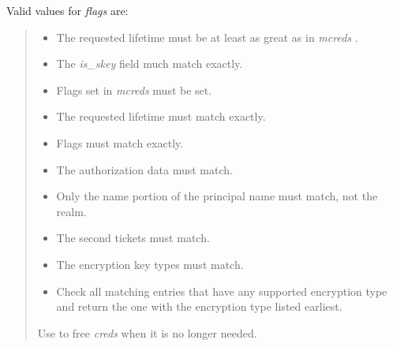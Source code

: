 \documentclass[letterpaper,10pt,english]{sphinxmanual}
\begin{document}
Valid values for \emph{flags} are:
\begin{quote}
\begin{itemize}
\item {} 
{\hyperref[appdev/refs/macros/KRB5_TC_MATCH_TIMES:KRB5_TC_MATCH_TIMES]{}} The requested lifetime must be at least as great as in \emph{mcreds} .

\item {} 
{\hyperref[appdev/refs/macros/KRB5_TC_MATCH_IS_SKEY:KRB5_TC_MATCH_IS_SKEY]{}} The \emph{is\_skey} field much match exactly.

\item {} 
{\hyperref[appdev/refs/macros/KRB5_TC_MATCH_FLAGS:KRB5_TC_MATCH_FLAGS]{}} Flags set in \emph{mcreds} must be set.

\item {} 
{\hyperref[appdev/refs/macros/KRB5_TC_MATCH_TIMES_EXACT:KRB5_TC_MATCH_TIMES_EXACT]{}} The requested lifetime must match exactly.

\item {} 
{\hyperref[appdev/refs/macros/KRB5_TC_MATCH_FLAGS_EXACT:KRB5_TC_MATCH_FLAGS_EXACT]{}} Flags must match exactly.

\item {} 
{\hyperref[appdev/refs/macros/KRB5_TC_MATCH_AUTHDATA:KRB5_TC_MATCH_AUTHDATA]{}} The authorization data must match.

\item {} 
{\hyperref[appdev/refs/macros/KRB5_TC_MATCH_SRV_NAMEONLY:KRB5_TC_MATCH_SRV_NAMEONLY]{}} Only the name portion of the principal name must match, not the realm.

\item {} 
{\hyperref[appdev/refs/macros/KRB5_TC_MATCH_2ND_TKT:KRB5_TC_MATCH_2ND_TKT]{}} The second tickets must match.

\item {} 
{\hyperref[appdev/refs/macros/KRB5_TC_MATCH_KTYPE:KRB5_TC_MATCH_KTYPE]{}} The encryption key types must match.

\item {} 
{\hyperref[appdev/refs/macros/KRB5_TC_SUPPORTED_KTYPES:KRB5_TC_SUPPORTED_KTYPES]{}} Check all matching entries that have any supported encryption type and return the one with the encryption type listed earliest.

\end{itemize}

Use {\hyperref[appdev/refs/api/krb5_free_cred_contents:c.krb5_free_cred_contents]{}} to free \emph{creds} when it is no longer needed.
\end{quote}
\end{document}
